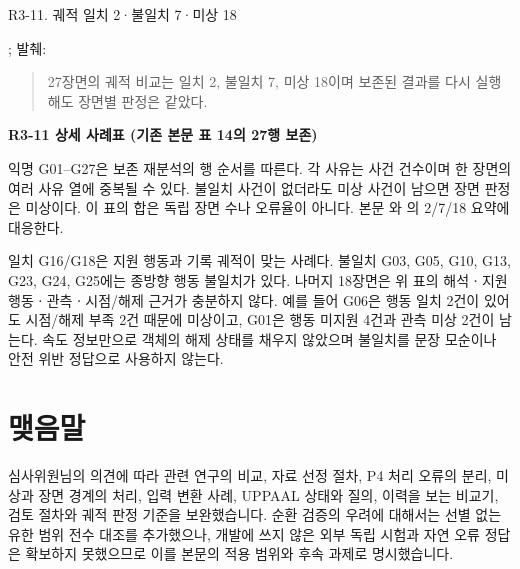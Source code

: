 \begin{reviewitem}{R3-11. 궤적 일치 2·불일치 7·미상 18}
\begin{manuscriptrevision}{; 발췌: }
\begin{quote}
27장면의 궤적 비교는 일치 2, 불일치 7, 미상 18이며 보존된 결과를 다시 실행해도 장면별 판정은 같았다.
\end{quote}
\end{manuscriptrevision}

\clearpage
\textbf{R3-11 상세 사례표 (기존 본문 표 14의 27행 보존)}

익명 G01--G27은 보존 재분석의 행 순서를 따른다. 각 사유는 사건 건수이며 한 장면의 여러 사유 열에 중복될 수 있다. 불일치 사건이 없더라도 미상 사건이 남으면 장면 판정은 미상이다. 이 표의 합은 독립 장면 수나 오류율이 아니다. 본문 와 의 2/7/18 요약에 대응한다.



일치 G16/G18은 지원 행동과 기록 궤적이 맞는 사례다. 불일치 G03, G05, G10, G13, G23, G24, G25에는 종방향 행동 불일치가 있다. 나머지 18장면은 위 표의 해석ㆍ지원 행동ㆍ관측ㆍ시점/해제 근거가 충분하지 않다. 예를 들어 G06은 행동 일치 2건이 있어도 시점/해제 부족 2건 때문에 미상이고, G01은 행동 미지원 4건과 관측 미상 2건이 남는다. 속도 정보만으로 객체의 해제 상태를 채우지 않았으며 불일치를 문장 모순이나 안전 위반 정답으로 사용하지 않는다.

\end{reviewitem}

\section*{맺음말}

심사위원님의 의견에 따라 관련 연구의 비교, 자료 선정 절차, P4 처리 오류의 분리, 미상과 장면 경계의 처리, 입력 변환 사례, UPPAAL 상태와 질의, 이력을 보는 비교기, 검토 절차와 궤적 판정 기준을 보완했습니다. 순환 검증의 우려에 대해서는 선별 없는 유한 범위 전수 대조를 추가했으나, 개발에 쓰지 않은 외부 독립 시험과 자연 오류 정답은 확보하지 못했으므로 이를 본문의 적용 범위와 후속 과제로 명시했습니다.


